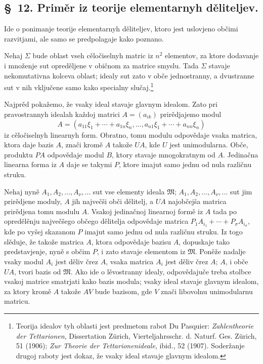 \documentclass[11pt]{article}
\newcommand{\ideal}[1]{\mathfrak{#1}}
\begin{document}

\setcounter{footnote}{46}
\subsection*{\S~12. Priměr iz teorije elementarnyh děliteljev.}

Ide o ponimanje teorije elementarnyh děliteljev, ktoro jest uslovjeno občimi razvitjami, ale samo se predpolagaje kako poznano.

Nehaj \(\Sigma\) bude oblast vseh cěločiselnyh matric iz \(n^2\) elementov, za ktore dodavanje i množenje sut opreděljene v običnom za matrice smyslu. Tada \(\Sigma\) stavaje nekomutativna kolceva oblast; idealy sut zato v obče jednostranny, a dvustranne sut v nih vključene samo kako specialny slučaj.\footnote{Teorija idealov tyh oblasti jest predmetom rabot Du Pasquier: \emph{Zahlentheorie der Tettarionen}, Dissertation Zürich, Vierteljahrsschr. d. Naturf. Ges. Zürich, 51 (1906); \emph{Zur Theorie der Tettarionenideale}, ibid., 52 (1907). Soderžanje drugoj raboty jest dokaz, že vsaky ideal stavaje glavnym idealom.}

Najprěd pokažemo, že vsaky ideal stavaje glavnym idealom. Zato pri pravostrannyh idealah každoj matrici \(A=(a_{ik})\) prirědjajemo modul
\[
 A=(a_{11}\xi_1+\cdots+a_{1n}\xi_n,
 \ldots,
 a_{n1}\xi_1+\cdots+a_{nn}\xi_n)
\]
iz cěločiselnyh linearnyh form. Obratno, tomu modulu odpovědaje vsaka matrica, ktora daje bazis \(A\), znači kromě \(A\) takože \(UA\), kde \(U\) jest unimodularna. Obče, produktu \(PA\) odpovědaje modul \(B\), ktory stavaje mnogokratnym od \(A\). Jedinačna linearna forma iz \(A\) daje se takymi \(P\), ktore imajut samo jednu od nula različnu struku.

Nehaj nyně \(A_1,A_2,\ldots,A_\nu,\ldots\) sut vse elementy ideala \(\ideal M\); \(A_1,A_2,\ldots,A_\nu,\ldots\) sut jim prirědjene moduly, \(A\) jih največši obči dělitelj, a \(UA\) najobčejša matrica prirědjena tomu modulu \(A\). Vsakoj jedinačnoj linearnoj formě iz \(A\) tada po opredělěnju največšego občego dělitelja odpovědaje matrica \(P_1A_{i_1}+\cdots+P_\sigma A_{i_\sigma}\), kde po vyšej skazanom \(P\) imajut samo jednu od nula različnu struku. Iz togo slěduje, že takože matrica \(A\), ktora odpovědaje bazisu \(A\), dopuskaje tako predstavjenje, nyně s občim \(P\), i zato stavaje elementom iz \(\ideal M\). Poněže nadalje vsaky modul \(A_i\) jest děliv črez \(A\), vsaka matrica \(A_i\) jest děliv črez \(A\); \(A\), i obče \(UA\), tvori bazis od \(\ideal M\). Ako ide o lěvostranny idealy, odpovědajuče treba stolbce vsakoj matrice smatrjati kako bazis modula; vsaky ideal stavaje glavnym idealom, za ktory kromě \(A\) takože \(AV\) bude bazisom, gde \(V\) znači libovolnu unimodularnu matricu.
\end{document}
